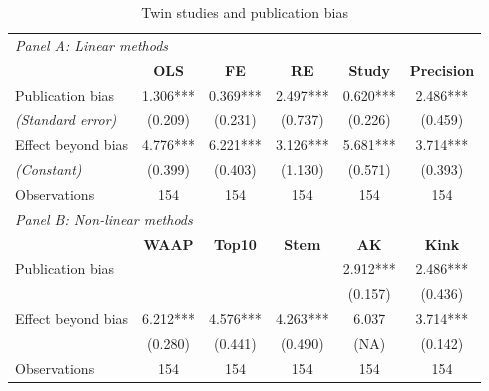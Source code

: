 \begin{table}[!htbp]
    \centering
    \small
    \singlespace
    \caption{Twin studies and publication bias}
    \label{tab:PB-Twins}
    \begin{tabular}{
            @{\hskip\tabcolsep\extracolsep}
            l*{5}{c}} %
        \toprule
        \multicolumn{6}{l}{\textit{Panel A: Linear methods}}                                            \\
        \multicolumn{1}{c}{}                  &
        \textbf{OLS}                          &
        \textbf{FE}                           &
        \textbf{RE}                           &
        \textbf{Study}                        &
        \textbf{Precision}                                                                              \\
        \midrule

        Publication bias                      & 1.306*** & 0.369*** & 2.497*** & 0.620*** & 2.486***    \\
        \emph{\hspace{0.2cm}(Standard error)} & (0.209)  & (0.231)  & (0.737)  & (0.226)  & (0.459)     \\
        \addlinespace[0.5em]
        Effect beyond bias                    & 4.776*** & 6.221*** & 3.126*** & 5.681*** & 3.714***    \\
        \emph{\hspace{0.2cm}(Constant)}       & (0.399)  & (0.403)  & (1.130)  & (0.571)  & (0.393)     \\
        \addlinespace[0.5em]
        Observations                          & 154      & 154      & 154      & 154      & 154         \\


        \midrule

        \multicolumn{6}{l}{\textit{Panel B: Non-linear methods}}                                        \\
                                              &
        \textbf{WAAP}                         &
        \textbf{Top10}                        &
        \textbf{Stem}                         &
        \textbf{AK}                           &
        \textbf{Kink}                                                                                   \\
        \midrule
        Publication bias                      &          &          &          & 2.912*** & 2.486***    \\
                                              &          &          &          & (0.157)  & (0.436)     \\
        \addlinespace[0.5em]
        Effect beyond bias                    & 6.212*** & 4.576*** & 4.263*** & 6.037    & 3.714***    \\
                                              & (0.280)  & (0.441)  & (0.490)  & (NA)     & (0.142)     \\
        \addlinespace[0.5em]
        Observations                          & 154      & 154      & 154      & 154      & 154         \\


\end{tabular}
\end{table}
